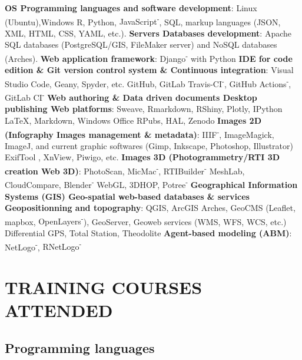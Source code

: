 \documentclass{article}
\begin{document}
\textbf{OS {\textbar} Programming languages and software development}: Linux (Ubuntu),Windows \textbf{{\textbar}} \textsf{R}, \textsf{Python}, \textsf{JavaScript\textsuperscript{-}}, SQL, markup languages (JSON, XML, HTML, CSS, YAML, etc.).
\smallbreak
\textbf{Servers {\textbar} Databases development}: Apache \textbf{{\textbar}} SQL databases (PostgreSQL/GIS, FileMaker server) and NoSQL databases (Arches).
\smallbreak
\textbf{Web application framework}: \textsf{Django}\textsuperscript{-} with \textsf{Python}
\smallbreak
\textbf{IDE for code edition \& Git version control system \& Continuous integration}: Visual Studio Code, Geany, Spyder, etc. \textbf{{\textbar}} GitHub, GitLab \textbf{{\textbar}} Travis-CI\textsuperscript{-}, GitHub Actions\textsuperscript{-}, GitLab CI\textsuperscript{-}
\smallbreak
\textbf{Web authoring \& Data driven documents {\textbar} Desktop publishing {\textbar} Web platforms}: \textsf{Sweave}, \textsf{Rmarkdown}, \textsf{RShiny}, \textsf{Plotly}, \textsf{IPython} \textbf{{\textbar}} \LaTeX, \textsf{Markdown}, Windows Office \textbf{{\textbar}} RPubs, HAL, Zenodo
\smallbreak
\textbf{Images 2D (Infography {\textbar} Images management \& metadata)}: IIIF\textsuperscript{-}, ImageMagick, ImageJ, and current graphic softwares (Gimp, Inkscape, Photoshop, Illustrator) {\textbar} ExifTool , XnView, Piwigo, etc.
\smallbreak
\textbf{Images 3D (Photogrammetry/RTI {\textbar} 3D creation {\textbar} Web 3D)}: PhotoScan, MicMac\textsuperscript{-}, RTIBuilder\textsuperscript{-} {\textbar} MeshLab, CloudCompare, Blender\textsuperscript{-} \textbf{{\textbar}} WebGL, 3DHOP, Potree\textsuperscript{-}
\smallbreak
\textbf{Geographical Information Systems (GIS) {\textbar} Geo-spatial web-based databases \& services {\textbar} Geopositionning and topography}: QGIS, ArcGIS {\textbar} Arches, GeoCMS (\textsf{Leaflet}, \textsf{mapbox}, \textsf{OpenLayers\textsuperscript{-}}), GeoServer, Geoweb services (WMS, WFS, WCS, etc.) {\textbar} Differential GPS, Total Station, Theodolite
\smallbreak
\textbf{Agent-based modeling (ABM)}: NetLogo\textsuperscript{-}, \textsf{RNetLogo\textsuperscript{-}}
\smallbreak

\section*{TRAINING COURSES ATTENDED}

\subsection*{Programming languages}
\end{document}

